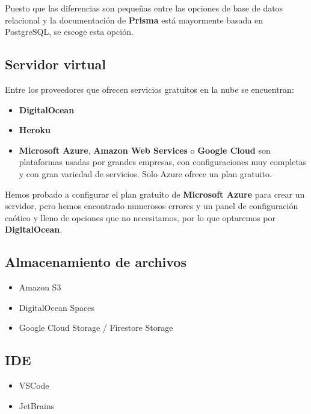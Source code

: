 Puesto que las diferencias son pequeñas entre las opciones de base de datos relacional y la documentación de \textbf{Prisma} está mayormente basada en PostgreSQL, se escoge esta opción.

\subsection{Servidor virtual}\label{subsection:elegirCloud}
Entre los proveedores que ofrecen servicios gratuitos en la nube se encuentran:

\begin{itemize}
    \item \textbf{DigitalOcean}
    \item \textbf{Heroku}
    \item \textbf{Microsoft Azure}, \textbf{Amazon Web Services} o \textbf{Google Cloud} son plataformas usadas por grandes empresas, con configuraciones muy completas y con gran variedad de servicios. Solo Azure ofrece un plan gratuito.
\end{itemize}

Hemos probado a configurar el plan gratuito de \textbf{Microsoft Azure} para crear un servidor, pero hemos encontrado numerosos errores y un panel de configuración caótico y lleno de opciones que no necesitamos, por lo que optaremos por \textbf{DigitalOcean}.


\subsection{Almacenamiento de archivos}
\begin{itemize}
    \item Amazon S3
    \item DigitalOcean Spaces
    \item Google Cloud Storage / Firestore Storage
\end{itemize}

\subsection{IDE}
\begin{itemize}
    \item VSCode
    \item JetBrains
\end{itemize}


